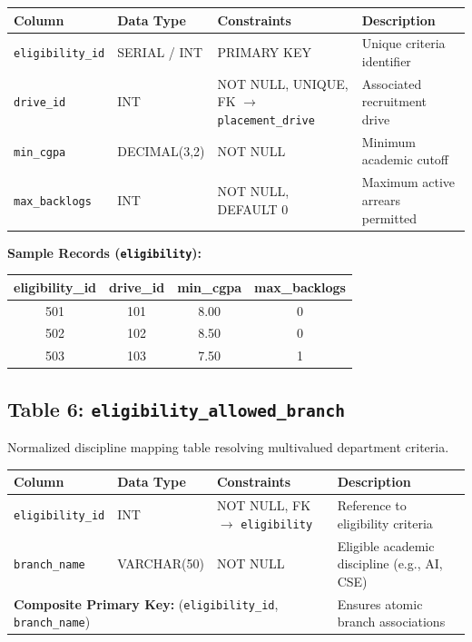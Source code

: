 \documentclass[11pt,a4paper]{article}
\begin{document}
\begin{table}[H]
    \centering
    \footnotesize
    \begin{tabularx}{\textwidth}{l l l X}
        \toprule
        \textbf{Column} & \textbf{Data Type} & \textbf{Constraints} & \textbf{Description} \\
        \midrule
        \texttt{eligibility\_id} & SERIAL / INT & PRIMARY KEY & Unique criteria identifier \\
        \texttt{drive\_id} & INT & NOT NULL, UNIQUE, FK \(\to\) \texttt{placement\_drive} & Associated recruitment drive \\
        \texttt{min\_cgpa} & DECIMAL(3,2) & NOT NULL & Minimum academic cutoff \\
        \texttt{max\_backlogs} & INT & NOT NULL, DEFAULT 0 & Maximum active arrears permitted \\
        \bottomrule
    \end{tabularx}
\end{table}

\textbf{Sample Records (\texttt{eligibility}):}
\begin{table}[H]
    \centering
    \scriptsize
    \begin{tabularx}{\textwidth}{c c c c}
        \toprule
        \textbf{eligibility\_id} & \textbf{drive\_id} & \textbf{min\_cgpa} & \textbf{max\_backlogs} \\
        \midrule
        501 & 101 & 8.00 & 0 \\
        502 & 102 & 8.50 & 0 \\
        503 & 103 & 7.50 & 1 \\
        \bottomrule
    \end{tabularx}
\end{table}

\subsection{Table 6: \texttt{eligibility\_allowed\_branch}}
Normalized discipline mapping table resolving multivalued department criteria.

\begin{table}[H]
    \centering
    \footnotesize
    \begin{tabularx}{\textwidth}{l l l X}
        \toprule
        \textbf{Column} & \textbf{Data Type} & \textbf{Constraints} & \textbf{Description} \\
        \midrule
        \texttt{eligibility\_id} & INT & NOT NULL, FK \(\to\) \texttt{eligibility} & Reference to eligibility criteria \\
        \texttt{branch\_name} & VARCHAR(50) & NOT NULL & Eligible academic discipline (e.g., AI, CSE) \\
        \multicolumn{3}{l}{\textbf{Composite Primary Key:} (\texttt{eligibility\_id}, \texttt{branch\_name})} & Ensures atomic branch associations \\
        \bottomrule
    \end{tabularx}
\end{table}
\end{document}
